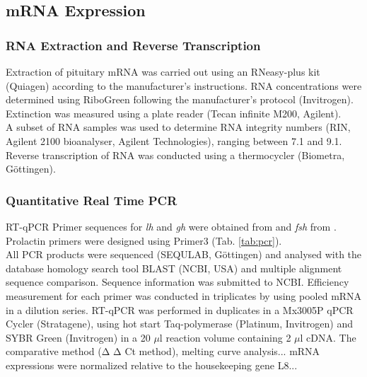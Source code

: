 \documentclass[twoside]{article}
\begin{document}
\begin{multicols}{2}
\subsection{mRNA Expression}

\subsubsection{RNA Extraction and Reverse Transcription}

Extraction of pituitary mRNA was carried out using an RNeasy-plus kit (Quiagen) according to the manufacturer's instructions. RNA concentrations were determined using RiboGreen following the manufacturer's protocol (Invitrogen). 
Extinction was measured using a plate reader (Tecan infinite M200, Agilent). \\

A subset of RNA samples was used to determine RNA integrity numbers (RIN, Agilent 2100 bioanalyser, Agilent Technologies), ranging between 7.1 and 9.1. Reverse transcription of RNA was conducted using a thermocycler (Biometra, G{\"o}ttingen).


\subsubsection{Quantitative Real Time PCR}
 RT-qPCR Primer sequences for \textit{lh} and \textit{gh} were obtained from 
\citep{lin2009} and \textit{fsh} from \citep{Xiaoying2014}. 
Prolactin primers were designed using Primer3 (Tab. \ref{tab:pcr}).\\
All PCR products were sequenced (SEQULAB, G{\"o}ttingen) and analysed with the database homology search tool BLAST (NCBI, USA) and multiple alignment sequence comparison. Sequence information was submitted to NCBI. Efficiency measurement for each primer was conducted in triplicates by using pooled mRNA in a dilution series. RT-qPCR was performed in duplicates in a Mx3005P qPCR Cycler (Stratagene), using hot start Taq-polymerase (Platinum, Invitrogen) and SYBR Green (Invitrogen) in a 20 ${\mu}$l reaction volume containing  2 ${\mu}$l cDNA. The comparative method (Δ Δ Ct method), melting curve analysis... %
mRNA expressions were normalized relative to the housekeeping gene L8... %





\end{multicols}
\end{document}
